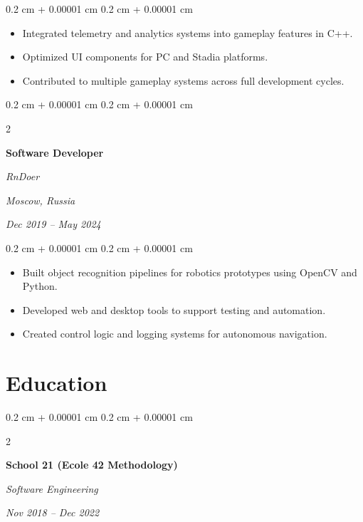 \documentclass[10pt, letterpaper]{article}
\newenvironment{highlights}{
    \begin{itemize}[
        topsep=0.10 cm,
        parsep=0.10 cm,
        partopsep=0pt,
        itemsep=0pt,
        leftmargin=0.4 cm + 10pt
    ]
}{
    \end{itemize}
} %
\newenvironment{onecolentry}{
    \begin{adjustwidth}{
        0.2 cm + 0.00001 cm
    }{
        0.2 cm + 0.00001 cm
    }
}{
    \end{adjustwidth}
} %
\newenvironment{twocolentry}[2][]{
    \onecolentry
    \def\secondColumn{#2}
    \setcolumnwidth{\fill, 4.5 cm}
    \begin{paracol}{2}
}{
    \switchcolumn \raggedleft \secondColumn
    \end{paracol}
    \endonecolentry
} %
\begin{document}
        \vspace{0.10 cm}
        \begin{onecolentry}
            \begin{highlights}
                \item Integrated telemetry and analytics systems into gameplay features in C++.
                \item Optimized UI components for PC and Stadia platforms.
                \item Contributed to multiple gameplay systems across full development cycles.
            \end{highlights}
        \end{onecolentry}
        
        \vspace{0.3 cm}

        \begin{twocolentry}{
        \textit{Moscow, Russia}    
            
        \textit{Dec 2019 –  May 2024}}
            \textbf{Software Developer}
            
            \textit{RnDoer}
        \end{twocolentry}

        \vspace{0.10 cm}
        \begin{onecolentry}
            \begin{highlights}
                \item Built object recognition pipelines for robotics prototypes using OpenCV and Python.
                \item Developed web and desktop tools to support testing and automation.
                \item Created control logic and logging systems for autonomous navigation.
            \end{highlights}
        \end{onecolentry}    
        
        \section{Education}

        
        \begin{twocolentry}{
            
            
        \textit{Nov 2018 – Dec 2022}}
            \textbf{School 21 (Ecole 42 Methodology)}

            \textit{Software Engineering}
        \end{twocolentry}
\end{document}
